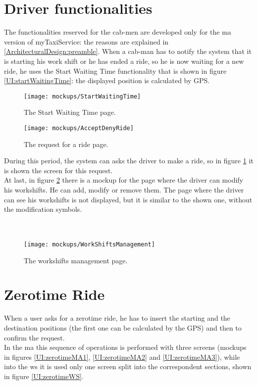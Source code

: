 \documentclass[\mainpath/main]{subfiles}
\begin{document}
\clearpage

\section{Driver functionalities}
\label{UI:DriverFunctionalities}
The functionalities reserved for the cab-men are developed only for the \gls{ma} version of myTaxiService: the reasons are explained in \autoref{ArchitecturalDesign:preamble}. When a cab-man has to notify the system that it is starting his work shift or he has ended a ride, so he is now waiting for a new ride, he uses the Start Waiting Time functionality that is shown in figure \ref{UI:startWaitingTime}: the displayed position is calculated by GPS.\\

\begin{figure}[ht!]
	\centering
	\begin{minipage}[t]{0.45\textwidth}
		\centering
		\texttt{[image: mockups/StartWaitingTime]}
		\caption{The Start Waiting Time page.}
		\label{UI:startWaitingTime}
	\end{minipage}
	\hspace{0.05 cm}
	\begin{minipage}[t]{0.45\linewidth}
		\centering
		\texttt{[image: mockups/AcceptDenyRide]}
		\caption[The request for a ride to a driver page.]{The request for a ride page.}
		\label{UI:acceptDenyRide}
	\end{minipage}
\end{figure}

During this period, the system can asks the driver to make a ride, so in figure \ref{UI:acceptDenyRide} it is shown the screen for this request.\\
At last, in figure \ref{UI:workshift} there is a mockup for the page where the driver can modify his workshifts. He can add, modify or remove them. The page where the driver can see his workshifts is not displayed, but it is similar to the shown one, without the modification symbols.\\
\\
\\

\begin{figure}[ht!]
	\centering
	\texttt{[image: mockups/WorkShiftsManagement]}
	\caption{The workshifts management page.}
	\label{UI:workshift}
\end{figure}

\section{Zerotime Ride}
\label{UI:ZerotimeRide}
When a user asks for a zerotime ride, he has to insert the starting and the destination positions (the first one can be calculated by the GPS) and then to confirm the request.\\
In the \gls{ma} this sequence of operations is performed with three screens (\glspl{mockup} in figures \ref{UI:zerotimeMA1}, \ref{UI:zerotimeMA2} and \ref{UI:zerotimeMA3}), while into the \gls{ws} it is used only one screen split into the correspondent sections, shown in figure \ref{UI:zerotimeWS}.
\end{document}
